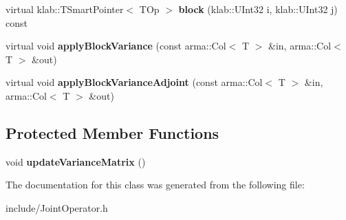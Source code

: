 \begin{DoxyCompactItemize}
\item 
virtual klab\+::\+T\+Smart\+Pointer$<$ T\+Op $>$ {\bfseries block} (klab\+::\+U\+Int32 i, klab\+::\+U\+Int32 j) const \hypertarget{classkl1p_1_1TJointOperator_a5712b7c821695ed63a54d4516713dcd6}{}\label{classkl1p_1_1TJointOperator_a5712b7c821695ed63a54d4516713dcd6}

\item 
virtual void {\bfseries apply\+Block\+Variance} (const arma\+::\+Col$<$ T $>$ \&in, arma\+::\+Col$<$ T $>$ \&out)\hypertarget{classkl1p_1_1TJointOperator_ae6c215a85649f95256b606e8d0f61971}{}\label{classkl1p_1_1TJointOperator_ae6c215a85649f95256b606e8d0f61971}

\item 
virtual void {\bfseries apply\+Block\+Variance\+Adjoint} (const arma\+::\+Col$<$ T $>$ \&in, arma\+::\+Col$<$ T $>$ \&out)\hypertarget{classkl1p_1_1TJointOperator_a51f701e8fe0263b275babddde47d3a46}{}\label{classkl1p_1_1TJointOperator_a51f701e8fe0263b275babddde47d3a46}

\end{DoxyCompactItemize}
\subsection*{Protected Member Functions}
\begin{DoxyCompactItemize}
\item 
void {\bfseries update\+Variance\+Matrix} ()\hypertarget{classkl1p_1_1TJointOperator_a7970572aa8abdaddf5d88d4ec3993f64}{}\label{classkl1p_1_1TJointOperator_a7970572aa8abdaddf5d88d4ec3993f64}

\end{DoxyCompactItemize}


The documentation for this class was generated from the following file\+:\begin{DoxyCompactItemize}
\item 
include/Joint\+Operator.\+h\end{DoxyCompactItemize}
